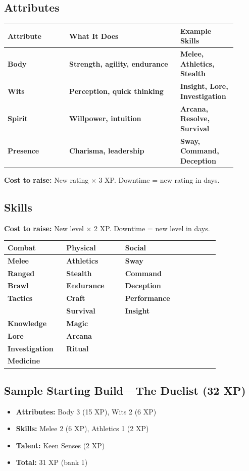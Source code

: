 \documentclass[10pt,twocolumn]{article} %
\begin{document}
\subsection{Attributes}
\begin{coretable}[Attributes]
\begin{tabular}{>{\bfseries}p{0.25\linewidth} >{\bfseries}p{0.45\linewidth} >{\bfseries}p{0.2\linewidth}}
\toprule
\textbf{Attribute} & \textbf{What It Does} & \textbf{Example Skills} \\
\midrule
Body & Strength, agility, endurance & Melee, Athletics, Stealth \\
Wits & Perception, quick thinking & Insight, Lore, Investigation \\
Spirit & Willpower, intuition & Arcana, Resolve, Survival \\
Presence & Charisma, leadership & Sway, Command, Deception \\
\bottomrule
\end{tabular}
\end{coretable}
\textbf{Cost to raise:} New rating $\times$ 3 XP. Downtime = new rating in days.

\subsection{Skills}
\textbf{Cost to raise:} New level $\times$ 2 XP. Downtime = new level in days.
\begin{coretable}
\begin{tabular}{>{\bfseries}p{0.25\linewidth} >{\bfseries}p{0.25\linewidth} >{\bfseries}p{0.4\linewidth}}
\toprule
\textbf{Combat} & \textbf{Physical} & \textbf{Social} \\
\midrule
Melee & Athletics & Sway \\
Ranged & Stealth & Command \\
Brawl & Endurance & Deception \\
Tactics & Craft & Performance \\
& Survival & Insight \\
\addlinespace
\textbf{Knowledge} & \textbf{Magic} & \\
Lore & Arcana & \\
Investigation & Ritual & \\
Medicine & & \\
\bottomrule
\end{tabular}
\end{coretable}

\subsection{Sample Starting Build---The Duelist (32 XP)}
\begin{itemize}[leftmargin=*]
    \item \textbf{Attributes:} Body 3 (15 XP), Wits 2 (6 XP)
    \item \textbf{Skills:} Melee 2 (6 XP), Athletics 1 (2 XP)
    \item \textbf{Talent:} Keen Senses (2 XP)
    \item \textbf{Total:} 31 XP (bank 1)
\end{itemize}
\end{document}
